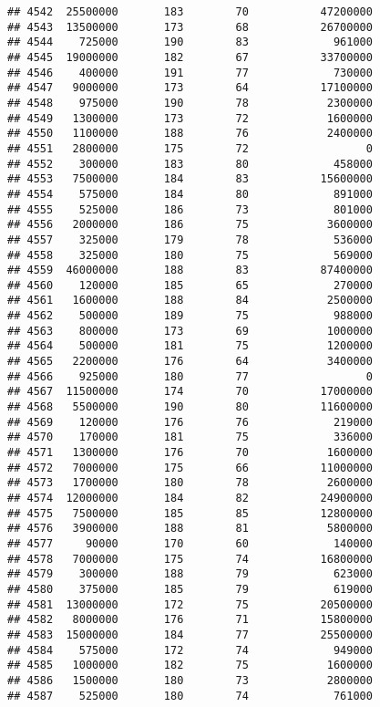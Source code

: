 \documentclass[
]{article}
\begin{document}
\begin{verbatim}
## 4542  25500000       183        70           47200000
## 4543  13500000       173        68           26700000
## 4544    725000       190        83             961000
## 4545  19000000       182        67           33700000
## 4546    400000       191        77             730000
## 4547   9000000       173        64           17100000
## 4548    975000       190        78            2300000
## 4549   1300000       173        72            1600000
## 4550   1100000       188        76            2400000
## 4551   2800000       175        72                  0
## 4552    300000       183        80             458000
## 4553   7500000       184        83           15600000
## 4554    575000       184        80             891000
## 4555    525000       186        73             801000
## 4556   2000000       186        75            3600000
## 4557    325000       179        78             536000
## 4558    325000       180        75             569000
## 4559  46000000       188        83           87400000
## 4560    120000       185        65             270000
## 4561   1600000       188        84            2500000
## 4562    500000       189        75             988000
## 4563    800000       173        69            1000000
## 4564    500000       181        75            1200000
## 4565   2200000       176        64            3400000
## 4566    925000       180        77                  0
## 4567  11500000       174        70           17000000
## 4568   5500000       190        80           11600000
## 4569    120000       176        76             219000
## 4570    170000       181        75             336000
## 4571   1300000       176        70            1600000
## 4572   7000000       175        66           11000000
## 4573   1700000       180        78            2600000
## 4574  12000000       184        82           24900000
## 4575   7500000       185        85           12800000
## 4576   3900000       188        81            5800000
## 4577     90000       170        60             140000
## 4578   7000000       175        74           16800000
## 4579    300000       188        79             623000
## 4580    375000       185        79             619000
## 4581  13000000       172        75           20500000
## 4582   8000000       176        71           15800000
## 4583  15000000       184        77           25500000
## 4584    575000       172        74             949000
## 4585   1000000       182        75            1600000
## 4586   1500000       180        73            2800000
## 4587    525000       180        74             761000

\end{verbatim}
\end{document}
